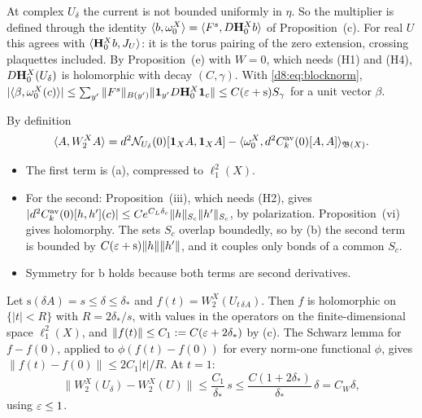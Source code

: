 \begin{detail}
\begin{step}
At complex $U_\delta$ the current is not bounded uniformly in $\eta$. So the multiplier is defined through the identity $\langle b,\omega_0^X\rangle=\langle F^s,D\mathbf H^X_0b\rangle$ of Proposition~(c). For real $U$ this agrees with $\langle \mathbf H^X_0b,J_U\rangle$: it is the torus pairing of the zero extension, crossing plaquettes included. By Proposition~(e) with $W=0$, which needs (H1) and (H4), $D\mathbf H^X_0(U_\delta)$ is holomorphic with decay $(C,\gamma)$. With \eqref{d8:eq:blocknorm}, $|\langle \beta,\omega_0^X(c)\rangle|\le\sum_{y'}\|F^s\|_{B(y')}\|\mathbf 1_{y'}D\mathbf H_0^X\mathbf 1_c\|\le C(\varepsilon+\mathrm s)S_\gamma$ for a unit vector $\beta$.
\end{step}

\begin{step}[(c): $W_2^X$ at $U_\delta$]
By definition
\[
\langle A,W_2^XA\rangle=d^2\mathcal N_{U_\delta}(0)[\mathbf 1_XA,\mathbf 1_XA]-\langle \omega_0^X,d^2C^{\rm av}_k(0)[A,A]\rangle_{\mathfrak B(X)} .
\]
\begin{itemize}
\item The first term is (a), compressed to $\ell^2_1(X)$.
\item For the second: Proposition~(iii), which needs (H2), gives $|d^2C^{\rm av}_k(0)[h,h'](c)|\le Ce^{C_L\delta_c}\|h\|_{S_c}\|h'\|_{S_c}$, by polarization. Proposition~(vi) gives holomorphy. The sets $S_c$ overlap boundedly, so by (b) the second term is bounded by $C(\varepsilon+\mathrm s)\|h\|\|h'\|$, and it couples only bonds of a common $S_c$.
\item Symmetry for $\mathrm b$ holds because both terms are second derivatives.
\end{itemize}
\end{step}

\begin{step}
Let $\mathrm s(\delta\!A)=s\le\delta\le\delta_*$ and $f(t)=W_2^X(U_{t\,\delta\!A})$. Then $f$ is holomorphic on $\{|t|<R\}$ with $R=2\delta_*/s$, with values in the operators on the finite-dimensional space $\ell^2_1(X)$, and $\|f(t)\|\le C_1:=C(\varepsilon+2\delta_*)$ by (c). The Schwarz lemma for $f-f(0)$, applied to $\phi(f(t)-f(0))$ for every norm-one functional $\phi$, gives $\|f(t)-f(0)\|\le2C_1|t|/R$. At $t=1$:
\[
\|W_2^X(U_\delta)-W_2^X(U)\|\le\frac{C_1}{\delta_*}\,s\le\frac{C(1+2\delta_*)}{\delta_*}\,\delta=C_W\delta,
\]
using $\varepsilon\le1$.
\end{step}


\end{detail}
